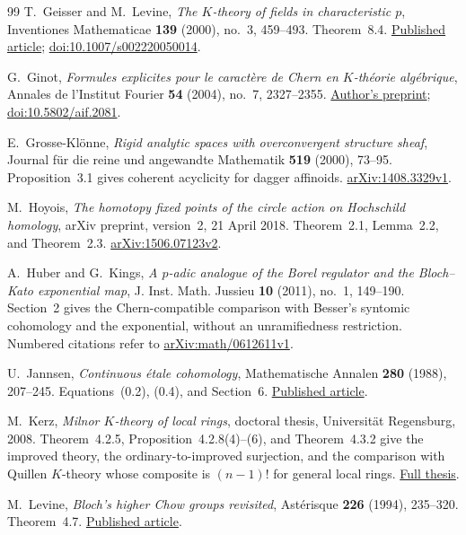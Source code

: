 \documentclass[11pt,a4paper]{amsart}
\numberwithin{equation}{section}
\theoremstyle{definition}
\theoremstyle{remark}
\begin{document}
\begin{thebibliography}{99}
T.~Geisser and M.~Levine, \emph{The $K$-theory of fields in
characteristic $p$}, Inventiones Mathematicae \textbf{139}
(2000), no.~3, 459--493. Theorem~8.4.
\href{https://www2.rikkyo.ac.jp/web/geisser/p-part.pdf}{Published article};
\href{https://doi.org/10.1007/s002220050014}{doi:10.1007/s002220050014}.

G.~Ginot, \emph{Formules explicites pour le caract\`ere de Chern en $K$-th\'eorie alg\'ebrique}, Annales de l'Institut Fourier \textbf{54} (2004), no.~7, 2327--2355.
\href{https://www.math.univ-paris13.fr/~ginot/papers/flecarch.pdf}{Author's preprint};
\href{https://doi.org/10.5802/aif.2081}{doi:10.5802/aif.2081}.

E.~Grosse-Kl\"onne, \emph{Rigid analytic spaces with overconvergent structure sheaf}, Journal f\"ur die reine und angewandte Mathematik \textbf{519} (2000), 73--95. Proposition~3.1 gives coherent acyclicity for dagger affinoids.
\href{https://arxiv.org/abs/1408.3329v1}{arXiv:1408.3329v1}.

M.~Hoyois, \emph{The homotopy fixed points of the circle action on
Hochschild homology}, arXiv preprint, version~2, 21 April 2018.
Theorem~2.1, Lemma~2.2, and Theorem~2.3.
\href{https://arxiv.org/abs/1506.07123v2}{arXiv:1506.07123v2}.

A.~Huber and G.~Kings, \emph{A $p$-adic analogue of the Borel regulator and the Bloch--Kato exponential map},
J. Inst. Math. Jussieu \textbf{10} (2011), no.~1, 149--190.
Section~2 gives the Chern-compatible comparison with Besser's
syntomic cohomology and the exponential, without an unramifiedness restriction.
Numbered citations refer to
\href{https://arxiv.org/abs/math/0612611v1}{arXiv:math/0612611v1}.

U.~Jannsen, \emph{Continuous \'etale cohomology}, Mathematische Annalen \textbf{280} (1988), 207--245. Equations~(0.2), (0.4), and Section~6.
\href{https://epub.uni-regensburg.de/26684/1/jannsen12.pdf}{Published article}.

M.~Kerz, \emph{Milnor $K$-theory of local rings}, doctoral thesis, Universit\"at Regensburg, 2008. Theorem~4.2.5, Proposition~4.2.8(4)--(6), and Theorem~4.3.2 give the improved theory, the ordinary-to-improved surjection, and the comparison with Quillen $K$-theory whose composite is $(n-1)!$ for general local rings.
\href{https://d-nb.info/98935329x/34}{Full thesis}.

M.~Levine,
\emph{Bloch's higher Chow groups revisited},
Ast\'erisque \textbf{226} (1994), 235--320. Theorem~4.7.
\href{https://www.numdam.org/item/AST_1994__226__235_0/}{Published article}.


\end{thebibliography}
\end{document}
